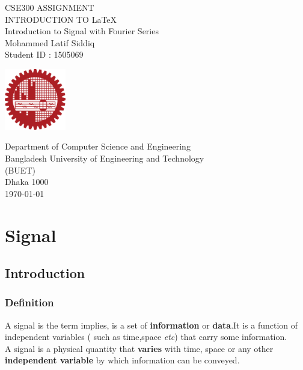 \documentclass{report}
\begin{document}
\begin{titlepage}
    \begin{center}
        \vspace*{1cm}
        
        \Large
         CSE300 ASSIGNMENT \\
         INTRODUCTION TO \LaTeX \\
         Introduction to Signal with Fourier Series \\
        \normalsize
        \vspace{1.5cm}
        Mohammed Latif Siddiq\\
        Student ID : 1505069
        
        \vfill
        
        \vspace{0.8cm}
        
        \includegraphics[width=0.2\textwidth]{buetlogo.png}
        
        \Large
        Department of Computer Science and Engineering\\
       Bangladesh University of Engineering and Technology\\
      (BUET)\\
      Dhaka 1000\\
       \today
        
    \end{center}
\end{titlepage}

\newpage

\tableofcontents

\chapter{Signal}

\section{Introduction}

\subsection{Definition}
A signal is the term implies, is a set of \textbf{information} or \textbf{data}.It is a function of independent variables ( such as time,space \textit{etc}) that carry some information.\\
A signal is a physical quantity that \textbf{varies} with time, space or any other \textbf{independent variable} by which information can be conveyed.
\end{document}
